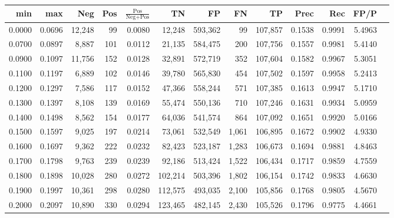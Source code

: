 \begin{tabular}{rrrrrrrrrrrrr}
\toprule
   min &    max &    Neg &   Pos & $\frac{\text{Pos}}{\text{Neg}+\text{Pos}}$ &      TN &      FP &      FN &      TP &   Prec &    Rec &   FP/P \\
\midrule
0.0000 & 0.0696 & 12,248 &    99 &                                     0.0080 &  12,248 & 593,362 &      99 & 107,857 & 0.1538 & 0.9991 & 5.4963 \\
0.0700 & 0.0897 &  8,887 &   101 &                                     0.0112 &  21,135 & 584,475 &     200 & 107,756 & 0.1557 & 0.9981 & 5.4140 \\
0.0900 & 0.1097 & 11,756 &   152 &                                     0.0128 &  32,891 & 572,719 &     352 & 107,604 & 0.1582 & 0.9967 & 5.3051 \\
0.1100 & 0.1197 &  6,889 &   102 &                                     0.0146 &  39,780 & 565,830 &     454 & 107,502 & 0.1597 & 0.9958 & 5.2413 \\
0.1200 & 0.1297 &  7,586 &   117 &                                     0.0152 &  47,366 & 558,244 &     571 & 107,385 & 0.1613 & 0.9947 & 5.1710 \\
0.1300 & 0.1397 &  8,108 &   139 &                                     0.0169 &  55,474 & 550,136 &     710 & 107,246 & 0.1631 & 0.9934 & 5.0959 \\
0.1400 & 0.1498 &  8,562 &   154 &                                     0.0177 &  64,036 & 541,574 &     864 & 107,092 & 0.1651 & 0.9920 & 5.0166 \\
0.1500 & 0.1597 &  9,025 &   197 &                                     0.0214 &  73,061 & 532,549 &   1,061 & 106,895 & 0.1672 & 0.9902 & 4.9330 \\
0.1600 & 0.1697 &  9,362 &   222 &                                     0.0232 &  82,423 & 523,187 &   1,283 & 106,673 & 0.1694 & 0.9881 & 4.8463 \\
0.1700 & 0.1798 &  9,763 &   239 &                                     0.0239 &  92,186 & 513,424 &   1,522 & 106,434 & 0.1717 & 0.9859 & 4.7559 \\
0.1800 & 0.1898 & 10,028 &   280 &                                     0.0272 & 102,214 & 503,396 &   1,802 & 106,154 & 0.1742 & 0.9833 & 4.6630 \\
0.1900 & 0.1997 & 10,361 &   298 &                                     0.0280 & 112,575 & 493,035 &   2,100 & 105,856 & 0.1768 & 0.9805 & 4.5670 \\
0.2000 & 0.2097 & 10,890 &   330 &                                     0.0294 & 123,465 & 482,145 &   2,430 & 105,526 & 0.1796 & 0.9775 & 4.4661 \\

\end{tabular}
